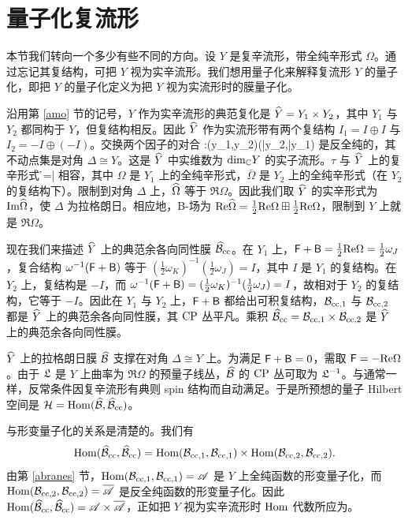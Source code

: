 \section{量子化复流形}\label{qcomp}

本节我们转向一个多少有些不同的方向。设 $Y$ 是复辛流形，带全纯辛形式 $\Omega$。通过忘记其复结构，可把 $Y$ 视为实辛流形。我们想用量子化来解释复流形 $Y$ 的量子化，即把 $Y$ 的量子化定义为把 $Y$ 视为实流形时的膜量子化。

沿用第 \ref{amo} 节的记号，$Y$ 作为实辛流形的典范复化是 $\widehat Y=Y_1\times Y_2$，其中 $Y_1$ 与 $Y_2$ 都同构于 $Y$，但复结构相反。因此 $\widehat Y$ 作为实流形带有两个复结构 $I_1=I\oplus I$ 与 $I_2=-I\oplus(-I)$。交换两个因子的对合
\be\label{qcomplextwo}\tau:(y_1,y_2)\mapsto(\bar y_2,\bar y_1)\ee
是反全纯的，其不动点集是对角 $\Delta\cong Y$。这是 $\widehat Y$ 中实维数为 ${\mathrm{dim}}_{\mathbb C} Y$ 的实子流形。$\tau$ 与 $\widehat Y$ 上的复辛形式
\be\label{qcomplexone}\h\Omega=\Omega\boxplus{}\bar\Omega\ee
相容，其中 $\Omega$ 是 $Y_1$ 上的全纯辛形式，$\bar\Omega$ 是 $Y_2$ 上的全纯辛形式（在 $Y_2$ 的复结构下）。限制到对角 $\Delta$ 上，$\widehat\Omega$ 等于 $\Re\Omega$。因此我们取 $\widehat Y$ 的实辛形式为 ${\mathrm{Im}}\widehat\Omega$，使 $\Delta$ 为拉格朗日。相应地，B-场为 ${\mathrm{Re}}\widehat\Omega=\frac12{\mathrm{Re}}\Omega\boxplus\frac12{\mathrm{Re}}\Omega$，限制到 $Y$ 上就是 $\Re\Omega$。

现在我们来描述 $\widehat Y$ 上的典范余各向同性膜 $\widehat{{\mathcal B}}_{\mathrm{cc}}$。在 $Y_1$ 上，${\sf F}+{\sf B}=\frac12{\mathrm{Re}}\Omega=\frac12\omega_J$，复合结构 $\omega^{-1}({\sf F}+{\sf B})$ 等于 $(\frac12\omega_K)^{-1}(\frac12\omega_J)=I$，其中 $I$ 是 $Y_1$ 的复结构。在 $Y_2$ 上，复结构是 $-I$，而 $\omega^{-1}({\sf F}+{\sf B})=(\frac12\omega_K)^{-1}(\frac12\omega_J)=I$，故相对于 $Y_2$ 的复结构，它等于 $-I$。因此在 $Y_1$ 与 $Y_2$ 上，${\sf F}+{\sf B}$ 都给出可积复结构，${\mathcal B}_{{\mathrm{cc}},1}$ 与 ${\mathcal B}_{{\mathrm{cc}},2}$ 都是 $\widehat Y$ 上的典范余各向同性膜，其 ${\mathrm{CP}}$ 丛平凡。乘积 $\widehat{{\mathcal B}}_{\mathrm{cc}}={\mathcal B}_{{\mathrm{cc}},1}\times{\mathcal B}_{{\mathrm{cc}},2}$ 是 $\widehat Y$ 上的典范余各向同性膜。

$\widehat Y$ 上的拉格朗日膜 $\widehat{{\mathcal B}}$ 支撑在对角 $\Delta\cong Y$ 上。为满足 ${\sf F}+{\sf B}=0$，需取 ${\sf F}=-{\mathrm{Re}}\Omega$。由于 ${\mathfrak L}$ 是 $Y$ 上曲率为 $\Re\Omega$ 的预量子线丛，$\widehat{{\mathcal B}}$ 的 ${\mathrm{CP}}$ 丛可取为 ${\mathfrak L}^{-1}$。与通常一样，反常条件因复辛流形有典则 spin 结构而自动满足。于是所预想的量子 Hilbert 空间是
${\mathcal H}={\mathrm{Hom}}(\widehat{{\mathcal B}},\widehat{{\mathcal B}}_{\mathrm{cc}})$。

与形变量子化的关系是清楚的。我们有
\[{\mathrm{Hom}}(\widehat{{\mathcal B}}_{\mathrm{cc}},\widehat{{\mathcal B}}_{\mathrm{cc}})={\mathrm{Hom}}({\mathcal B}_{{\mathrm{cc}},1},{\mathcal B}_{{\mathrm{cc}},1})\times{\mathrm{Hom}}({\mathcal B}_{{\mathrm{cc}},2},{\mathcal B}_{{\mathrm{cc}},2}).\]由第 \ref{abranes} 节，${\mathrm{Hom}}({\mathcal B}_{{\mathrm{cc}},1},{\mathcal B}_{{\mathrm{cc}},1})={\mathscr A}$ 是 $Y$ 上全纯函数的形变量子化，而 ${\mathrm{Hom}}({\mathcal B}_{{\mathrm{cc}},2},{\mathcal B}_{{\mathrm{cc}},2})=\overline{{\mathscr A}}$ 是反全纯函数的形变量子化。因此 ${\mathrm{Hom}}(\widehat{{\mathcal B}}_{\mathrm{cc}},\widehat{{\mathcal B}}_{\mathrm{cc}})={\mathscr A}\times\overline{{\mathscr A}}$，正如把 $Y$ 视为实辛流形时 ${\mathrm{Hom}}$ 代数所应为。

